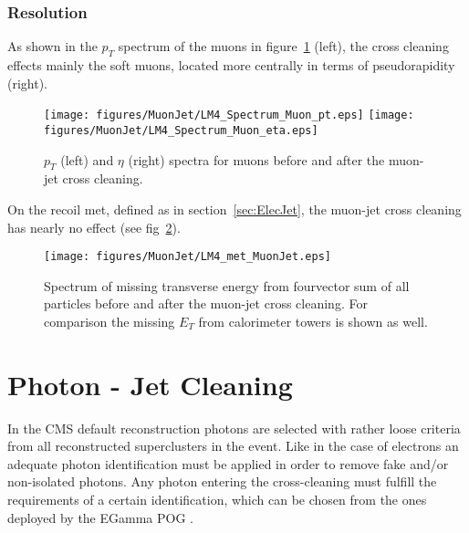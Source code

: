 \documentclass{cmspaper}
\begin{document}
\subsubsection{Resolution}
As shown in the \(p_T\) spectrum of the muons in
figure~\ref{fig:ObjSpectra_MuonJet} (left), the cross cleaning effects mainly
the soft muons, located more centrally in terms of pseudorapidity (right).

\begin{figure}[hb]
\begin{center}
    \texttt{[image: figures/MuonJet/LM4\_Spectrum\_Muon\_pt.eps]}
    \texttt{[image: figures/MuonJet/LM4\_Spectrum\_Muon\_eta.eps]}
    \caption{\(p_T\) (left) and \(\eta\) (right) spectra for muons before and
    after the muon-jet cross cleaning.}
\label{fig:ObjSpectra_MuonJet}
\end{center}
\end{figure} 

On the recoil met, defined as in section~\ref{sec:ElecJet}, the muon-jet cross
cleaning has nearly no effect (see fig~\ref{fig:met_MuonJet}).

\begin{figure}[hb]
\begin{center}
    \texttt{[image: figures/MuonJet/LM4\_met\_MuonJet.eps]}
    \caption{Spectrum of missing transverse energy from fourvector sum of all
    particles before and after the muon-jet cross cleaning. For comparison the
    missing $E_T$ from calorimeter towers is shown as well.}
\label{fig:met_MuonJet}
\end{center}
\end{figure}

\clearpage


\section{Photon - Jet Cleaning}
In the CMS default reconstruction photons are selected with rather loose
criteria from all reconstructed superclusters in the event. Like in the case of
electrons an adequate photon identification must be applied in order to remove
fake and/or non-isolated photons. Any photon entering the cross-cleaning must
fulfill the requirements of a certain identification, which can be chosen from
the ones deployed by the EGamma POG \cite{photonID}. 
\end{document}
